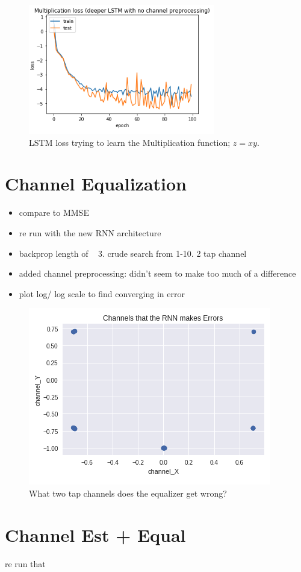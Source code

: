 \begin{figure}
\begin{center}
\includegraphics{figures/LSTM_loss_multiplication.png}
\caption{LSTM loss trying to learn the Multiplication function; $z=xy$.}
\end{center}
\label{fig:lstm_loss_mult}
\end{figure}


\section{Channel Equalization}

\begin{itemize}
\item compare to MMSE
\item re run with the new RNN architecture
\item backprop length of ~ 3. crude search from 1-10. 2 tap channel
\item added channel preprocessing: didn't seem to make too much of a difference
\item plot log/ log scale to find converging in error
\end{itemize}

\begin{figure}
\begin{center}
\includegraphics{figures/incorrect_channels.png}
\caption{What two tap channels does the equalizer get wrong?}
\end{center}
\label{fig:incorr_chan}
\end{figure}

\section{Channel Est + Equal}
re run that 